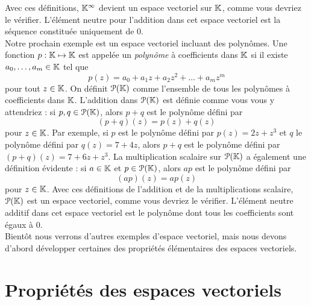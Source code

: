 \documentclass[12pt]{book}
\theoremstyle{plain}
\begin{document}
Avec ces définitions, $\mathbb{K}^{\infty}$ devient un espace vectoriel sur $\mathbb{K}$, comme vous devriez le vérifier. L’élément neutre pour l'addition dans cet espace vectoriel est la séquence constituée uniquement de 0.\\
\indent
Notre prochain exemple est un espace vectoriel incluant des polynômes. Une fonction $p:\mathbb{K}\mapsto\mathbb{K}$ est appelée un \textit{polynôme} à coefficients dans $\mathbb{K}$ si il existe $a_0,\ldots,a_m\in\mathbb{K}$ tel que
\begin{equation*}
    p(z)=a_0+a_1z+a_2z^2+\ldots+a_mz^m
\end{equation*}
pour tout $z\in\mathbb{K}$. On définit $\mathcal{P}(\mathbb{K})$ comme l’ensemble de tous les polynômes  à coefficients dans $\mathbb{K}$. L’addition dans $\mathcal{P}(\mathbb{K})$ est définie comme vous vous y attendriez : si $p,q\in\mathcal{P}(\mathbb{K})$, alors $p+q$ est le polynôme défini par
\begin{equation*}
    (p+q)(z)=p(z)+q(z)
\end{equation*}
pour $z\in\mathbb{K}$. Par exemple, si $p$ est le polynôme défini par $p(z)=2z+z^3$ et $q$ le polynôme défini par $q(z)=7+4z$, alors $p+q$ est le polynôme défini par $(p+q)(z)=7+6z+z^3$. La multiplication scalaire sur $\mathcal{P}(\mathbb{K})$ a également une définition évidente : si $a\in\mathbb{K}$ et $p\in\mathcal{P}(\mathbb{K})$, alors $ap$ est le polynôme défini par
\begin{equation*}
    (ap)(z)=ap(z)
\end{equation*}
pour $z\in\mathbb{K}$. Avec ces définitions de l’addition et de la multiplications scalaire, $\mathcal{P}(\mathbb{K})$ est un espace vectoriel, comme vous devriez le vérifier. L’élément neutre additif dans cet espace vectoriel est le polynôme dont tous les coefficients sont égaux à 0.\\
\indent
Bientôt nous verrons d’autres exemples d’espace vectoriel, mais nous devons d’abord développer certaines des propriétés élémentaires des espaces vectoriels.\\


\section*{Propriétés des espaces vectoriels}
\end{document}
